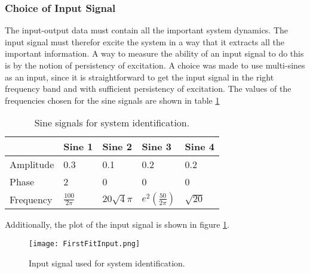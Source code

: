 \documentclass[main.tex]{subfiles}
\begin{document}
\subsubsection{Choice of Input Signal}
The input-output data must contain all the important system dynamics. The input signal must therefor excite the system in a way that it extracts all the important information. A way to measure the ability of an input signal to do this is by the notion of persistency of excitation\cite{persistancy}. 
A choice was made to use multi-sines as an input, since it is straightforward to get the input signal in the right frequency band and with sufficient persistency of excitation. The values of the frequencies chosen for the sine signals are shown in table \ref{tabel:sines}


\begin{table}[h]
\centering
\caption{Sine signals for system identification.}
\label{tabel:sines}
\begin{tabular}{|l|l|l|l|l|}
\hline
          & Sine 1            & Sine 2          & Sine 3                 & Sine 4      \\ \hline
Amplitude & 0.3               & 0.1             & 0.2                    & 0.2         \\ \hline
Phase     & 2                 & 0               & 0                      & 0           \\ \hline
Frequency & $\frac{100}{2\pi}$ & $20\sqrt{4}\pi$ & $e^2(\frac{50}{2\pi})$ & $\sqrt{20}$ \\ \hline
\end{tabular}
\end{table}

Additionally, the plot of the input signal is shown in figure \ref{fig:FirstFitInput}.


\begin{figure}[ht]
\centering
\texttt{[image: FirstFitInput.png]}
\caption{\label{fig:FirstFitInput} Input signal used for system identification.}
\end{figure}
\end{document}
